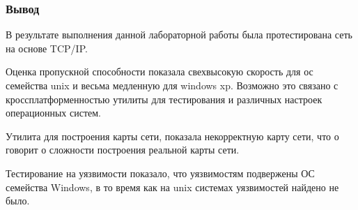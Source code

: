 \documentclass[9pt, compress]{beamer}
\begin{document}
\begin{frame}[fragile]
\frametitle{Вывод}
В результате выполнения данной лабораторной работы была протестирована сеть на основе TCP/IP. 

Оценка пропускной способности показала свехвысокую скорость для ос семейства unix и весьма медленную для windows xp. Возможно это связано с кроссплатформенностью утилиты для тестирования и различных настроек операционных систем.

Утилита для построения карты сети, показала некорректную карту сети, что о говорит о сложности построения реальной карты сети.

Тестирование на уязвимости показало, что уязвимостям подвержены ОС семейства Windows, в то время как на unix системах уязвимостей найдено не было.




\end{frame}	
	

	
\end{document}
